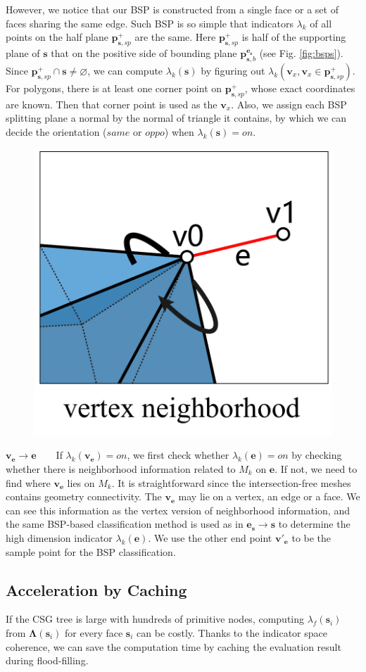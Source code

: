 \documentclass[10pt,journal,compsoc]{IEEEtran}
\begin{document}
However, we notice that our BSP is constructed from a single face or a set of faces sharing the same edge. Such BSP is so simple that indicators $\lambda_k$ of all points on the half plane $\bm{p}_{\bm{s}, sp}^+$ are the same. Here $\bm{p}_{\bm{s}, sp}^+$ is half of the supporting plane of $\bm{s}$ that on the positive side of bounding plane $\bm{p}_{\bm{s}, b}^{\bm{e}_{\bm{s}}}$ (see Fig. \ref{fig:bsps}). Since $\bm{p}_{\bm{s}, sp}^+ \cap \bm{s} \neq \varnothing$, we can compute $\lambda_k(\bm{s})$ by figuring out $\lambda_k(\bm{v}_x, \bm{v}_x \in \bm{p}_{\bm{s}, sp}^+)$. For polygons, there is at least one corner point on $\bm{p}_{\bm{s}, sp}^+$, whose exact coordinates are known. Then that corner point is used as the $\bm{v}_x$. Also, we assign each BSP splitting plane a normal by the normal of triangle it contains, by which we can decide the orientation ($same$ or $oppo$) when $\lambda_k(\bm{s})=on$.

\vspace{0.5em}
\begin{figure}
 \includegraphics[width=1.3 in]{vneighbor}
\end{figure}
\noindent\textbf{$\bm{\bm{v}_{\bm{e}}\to e}$}~~~~If $\lambda_k(\bm{v}_{\bm{e}})=on$, we first check whether $\lambda_k(\bm{e}) = on$ by checking whether there is neighborhood information related to $M_k$ on $\bm{e}$. If not, we need to find where $\bm{v}_{\bm{e}}$ lies on $M_k$. It is straightforward since the intersection-free meshes contains geometry connectivity. The $\bm{v}_{\bm{e}}$ may lie on a vertex, an edge or a face. We can see this information as the vertex version of neighborhood information, and the same BSP-based classification method is used as in ${\bm{e}_{\bm{s}}\to \bm{s}}$ to determine the high dimension indicator $\lambda_k(\bm{e})$. We use the other end point $\bm{v}'_{\bm{e}}$ to be the sample point for the BSP classification.

\subsection{Acceleration by Caching}
\label{sec:acc}
If the CSG tree is large with hundreds of primitive nodes, computing $\lambda_f(\bm{s}_i)$ from $\boldsymbol{\Lambda}(\bm{s}_i)$ for every face $\bm{s}_i$ can be costly. Thanks to the indicator space coherence, we can save the computation time by caching the evaluation result during flood-filling.
\end{document}
